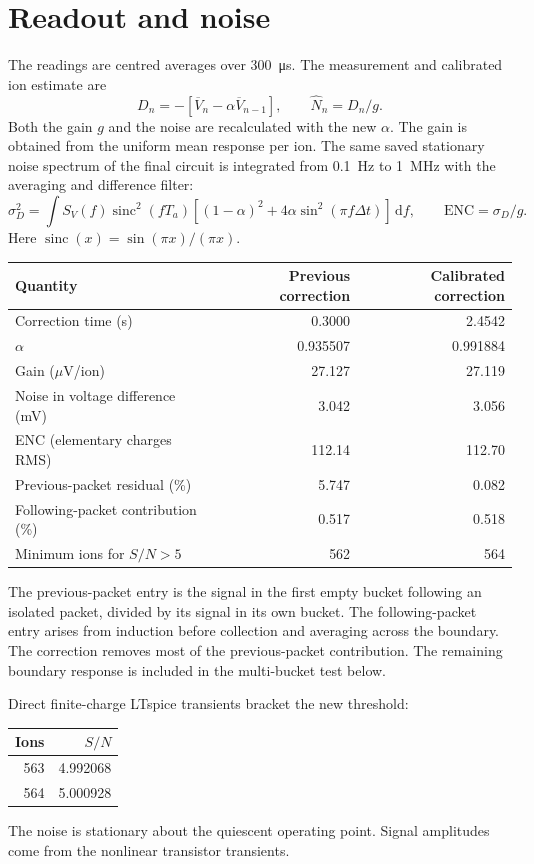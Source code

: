 \documentclass[11pt,a4paper]{article}
\begin{document}
\section{Readout and noise}
The readings are centred averages over \SI{300}{\micro\second}. The
measurement and calibrated ion estimate are
\[
 D_n=-[\overline V_n-\alpha\overline V_{n-1}],\qquad
 \widehat N_n=D_n/g.
\]
Both the gain $g$ and the noise are recalculated with the new $\alpha$.
The gain is obtained from the uniform mean response per ion. The same saved
stationary noise spectrum of the final circuit is integrated from
\SI{0.1}{Hz} to \SI{1}{MHz} with the averaging and difference filter:
\[
 \sigma_D^2=\int S_V(f)\operatorname{sinc}^2(fT_a)
 \left[(1-\alpha)^2+4\alpha\sin^2(\pi f\Delta t)\right]\,\mathrm{d}f,
 \qquad \mathrm{ENC}=\sigma_D/g.
\]
Here $\operatorname{sinc}(x)=\sin(\pi x)/(\pi x)$.

\begin{center}\begin{tabular}{lrr}\toprule
Quantity & Previous correction & Calibrated correction\\\midrule
Correction time (s) & 0.3000 & 2.4542 \\
$\alpha$ & 0.935507 & 0.991884 \\
Gain ($\mu$V/ion) & 27.127 & 27.119 \\
Noise in voltage difference (mV) & 3.042 & 3.056 \\
ENC (elementary charges RMS) & 112.14 & 112.70 \\
Previous-packet residual (\%) & 5.747 & 0.082 \\
Following-packet contribution (\%) & 0.517 & 0.518 \\
Minimum ions for $S/N>5$ & 562 & 564 \\
\bottomrule\end{tabular}\end{center}
The previous-packet entry is the signal in the first empty bucket following
an isolated packet, divided by its signal in its own bucket. The following-packet
entry arises from induction before collection and averaging across the boundary.
The correction removes most of the previous-packet contribution. The remaining
boundary response is included in the multi-bucket test below.

Direct finite-charge LTspice transients bracket the new threshold:
\begin{center}\begin{tabular}{rr}\toprule
Ions & $S/N$\\\midrule
563 & 4.992068 \\
564 & 5.000928 \\
\bottomrule\end{tabular}\end{center}
The noise is stationary about the quiescent operating point. Signal amplitudes
come from the nonlinear transistor transients.
\end{document}

